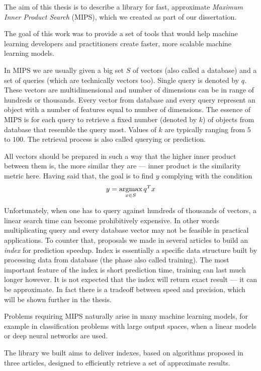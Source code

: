 The aim of this thesis is to describe a library for fast, approximate \textit{Maximum Inner Product Search} (MIPS),
which we created as part of our dissertation. 

The goal of this work was to provide a set of tools that would help machine learning developers and practitioners create faster, 
more scalable machine learning models.

In MIPS we are usually given a big set $S$ of vectors (also called a database) and a set of queries
(which are technically vectors too). Single query is denoted by $q$.
These vectors are multidimensional and number of dimensions can be in range of hundreds or thousands.
Every vector from database and every query represent an object with a number of features equal to number of dimensions.
The essence of MIPS is for each query to retrieve a fixed number (denoted by $k$)
of objects from database that resemble the query most.
Values of $k$ are typically ranging from $5$ to $100$.
The retrieval process is also called querying or prediction.

All vectors should be prepared in such a way that the higher inner product between them is, the more similar they are
 --- inner product is the similarity metric here. Having said that, the goal is to find $y$ complying with the condition
\[ y = \operatorname*{argmax}_{x \in S} q^T x \]

Unfortunately, when one has to query against hundreds of thousands of vectors,
a linear search time can become prohibitively expensive.
In other words multiplicating query and every database vector may not be feasible in practical applications.
To counter that, proposals we made in several articles to build an \textit{index} for prediction speedup.
Index is essentially a specific data structure built by processing data from database (the phase also called training).
The most important feature of the index is short prediction time, training can last much longer however.
It is not expected that the index will return exact result --- it can be approximate.
In fact there is a tradeoff between speed and precision, which will be shown further in the thesis.

Problems requiring MIPS naturally arise in many machine learning models, for example in
classification problems with large output spaces, when a linear models or deep neural networks are used.

The library we built aims to deliver indexes, based on algorithms proposed in three articles,
designed to efficiently retrieve a set of approximate results.

